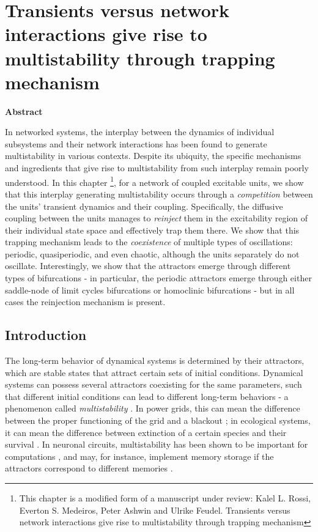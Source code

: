 \chapter{Transients versus network interactions give rise to multistability through trapping mechanism}\label{chap:multistability}

\vspace{1.5em}
\noindent
{\large\textbf{Abstract}} \vspace{0.5cm}

In networked systems, the interplay between the dynamics of individual subsystems and their network interactions has been found to generate multistability in various contexts. Despite its ubiquity, the specific mechanisms and ingredients that give rise to multistability from such interplay remain poorly understood. In this chapter \footnote[1]{This chapter is a modified form of a manuscript under review: Kalel L. Rossi, Everton S. Medeiros, Peter Ashwin and Ulrike Feudel. Transients versus network interactions give rise to multistability through trapping mechanism}, for a network of coupled excitable units, we show that this interplay generating multistability occurs through a \textit{competition} between the units' transient dynamics and their coupling. Specifically, the diffusive coupling between the units manages to \textit{reinject} them in the excitability region of their individual state space and effectively trap them there. We show that this trapping mechanism leads to the \textit{coexistence} of multiple types of oscillations: periodic, quasiperiodic, and even chaotic, although the units separately do not oscillate. Interestingly, we show that the attractors emerge through different types of bifurcations - in particular, the periodic attractors emerge through either saddle-node of limit cycles bifurcations or homoclinic bifurcations - but in all cases the reinjection mechanism is present. 
\vspace{1.5em}

\section{Introduction}

The long-term behavior of dynamical systems is determined by their attractors, which are stable states that attract certain sets of initial conditions. Dynamical systems can possess several attractors coexisting for the same parameters, such that different initial conditions can lead to different long-term behaviors - a phenomenon called \textit{multistability} \cite{pisarchik2014control, feudel2018multistability}. In power grids, this can mean the difference between the proper functioning of the grid and a blackout \cite{motter2013spontaneous}; in ecological systems, it can mean the difference between extinction of a certain species and their survival \cite{meng2022the}. In neuronal circuits, multistability has been shown to be important for computations \cite{driscoll2024flexible}, and may, for instance, implement memory storage if the attractors correspond to different memories \cite{foss1996multistability, wilson1972excitatory}.

